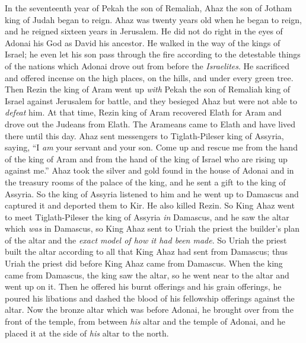 \begin{biblechapter} %
 In the seventeenth year of Pekah the son of Remaliah, Ahaz the son of Jotham king of Judah began to reign.
\verse Ahaz was twenty years old when he began to reign, and he reigned sixteen years in Jerusalem. He did not do right in the eyes of Adonai his God as David his ancestor.
\verse He walked in the way of the kings of Israel; he even let his son pass through the fire according to the detestable things of the nations which Adonai drove out from before the \textit{Israelites}.
\verse He sacrificed and offered incense on the high places, on the hills, and under every green tree.
\verse Then Rezin the king of Aram went up \textit{with} Pekah the son of Remaliah king of Israel against Jerusalem for battle, and they besieged Ahaz but were not able to \textit{defeat} him.
\verse At that time, Rezin king of Aram recovered Elath for Aram and drove out the Judeans from Elath. The Arameans came to Elath and have lived there until this day.
\verse Ahaz sent messengers to Tiglath-Pileser king of Assyria, saying, “I \textit{am} your servant and your son. Come up and rescue me from the hand of the king of Aram and from the hand of the king of Israel who are rising up against me.”
\verse Ahaz took the silver and gold found in the house of Adonai and in the treasury rooms of the palace of the king, and he sent a gift to the king of Assyria.
\verse So the king of Assyria listened to him and he went up to Damascus and captured it and deported them to Kir. He also killed Rezin.
 So King Ahaz went to meet Tiglath-Pileser the king of Assyria \textit{in} Damascus, and he saw the altar which \textit{was} in Damascus, so King Ahaz sent to Uriah the priest the builder’s plan of the altar and the \textit{exact model of how it had been made}.
\verse So Uriah the priest built the altar according to all that King Ahaz had sent from Damascus; thus Uriah the priest did before King Ahaz came from Damascus.
\verse When the king came from Damascus, the king saw the altar, so he went near to the altar and went up on it.
\verse Then he offered his burnt offerings and his grain offerings, he poured his libations and dashed the blood of his fellowship offerings against the altar.
\verse Now the bronze altar which was before Adonai, he brought over from the front of the temple, from between \textit{his} altar and the temple of Adonai, and he placed it at the side of \textit{his} altar to the north.

\end{biblechapter}
